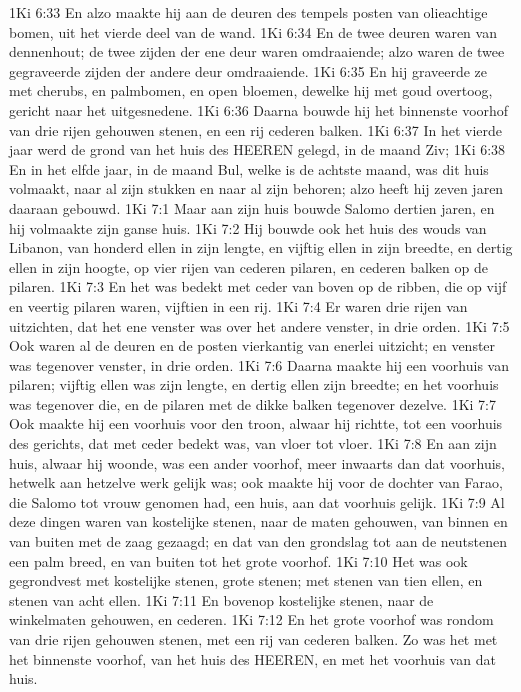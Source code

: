 1Ki 6:33  En alzo maakte hij aan de deuren des tempels posten van olieachtige bomen, uit het vierde deel van de wand.
1Ki 6:34  En de twee deuren waren van dennenhout; de twee zijden der ene deur waren omdraaiende; alzo waren de twee gegraveerde zijden der andere deur omdraaiende.
1Ki 6:35  En hij graveerde ze met cherubs, en palmbomen, en open bloemen, dewelke hij met goud overtoog, gericht naar het uitgesnedene.
1Ki 6:36  Daarna bouwde hij het binnenste voorhof van drie rijen gehouwen stenen, en een rij cederen balken.
1Ki 6:37  In het vierde jaar werd de grond van het huis des HEEREN gelegd, in de maand Ziv;
1Ki 6:38  En in het elfde jaar, in de maand Bul, welke is de achtste maand, was dit huis volmaakt, naar al zijn stukken en naar al zijn behoren; alzo heeft hij zeven jaren daaraan gebouwd.
1Ki 7:1  Maar aan zijn huis bouwde Salomo dertien jaren, en hij volmaakte zijn ganse huis.
1Ki 7:2  Hij bouwde ook het huis des wouds van Libanon, van honderd ellen in zijn lengte, en vijftig ellen in zijn breedte, en dertig ellen in zijn hoogte, op vier rijen van cederen pilaren, en cederen balken op de pilaren.
1Ki 7:3  En het was bedekt met ceder van boven op de ribben, die op vijf en veertig pilaren waren, vijftien in een rij.
1Ki 7:4  Er waren drie rijen van uitzichten, dat het ene venster was over het andere venster, in drie orden.
1Ki 7:5  Ook waren al de deuren en de posten vierkantig van enerlei uitzicht; en venster was tegenover venster, in drie orden.
1Ki 7:6  Daarna maakte hij een voorhuis van pilaren; vijftig ellen was zijn lengte, en dertig ellen zijn breedte; en het voorhuis was tegenover die, en de pilaren met de dikke balken tegenover dezelve.
1Ki 7:7  Ook maakte hij een voorhuis voor den troon, alwaar hij richtte, tot een voorhuis des gerichts, dat met ceder bedekt was, van vloer tot vloer.
1Ki 7:8  En aan zijn huis, alwaar hij woonde, was een ander voorhof, meer inwaarts dan dat voorhuis, hetwelk aan hetzelve werk gelijk was; ook maakte hij voor de dochter van Farao, die Salomo tot vrouw genomen had, een huis, aan dat voorhuis gelijk.
1Ki 7:9  Al deze dingen waren van kostelijke stenen, naar de maten gehouwen, van binnen en van buiten met de zaag gezaagd; en dat van den grondslag tot aan de neutstenen een palm breed, en van buiten tot het grote voorhof.
1Ki 7:10  Het was ook gegrondvest met kostelijke stenen, grote stenen; met stenen van tien ellen, en stenen van acht ellen.
1Ki 7:11  En bovenop kostelijke stenen, naar de winkelmaten gehouwen, en cederen.
1Ki 7:12  En het grote voorhof was rondom van drie rijen gehouwen stenen, met een rij van cederen balken. Zo was het met het binnenste voorhof, van het huis des HEEREN, en met het voorhuis van dat huis.

